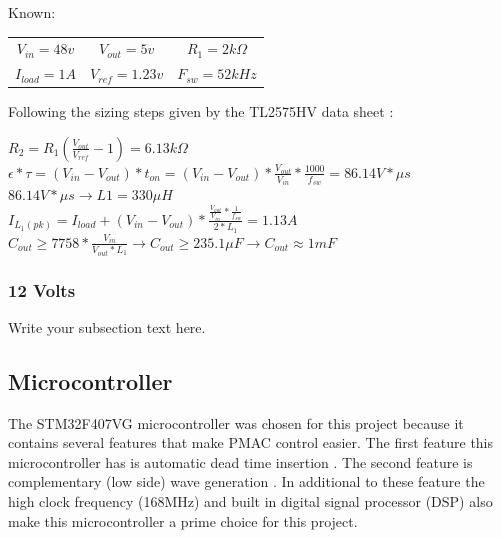 \documentclass{article}
\begin{document}
		\vspace{3mm}
		\noindent Known:
		\begin{center}
			\begin{tabular}{ c c c }
			$V_{in} = 48v$ & $V_{out} = 5v$ & $R_{1} = 2k\Omega$ \\
			$I_{load} = 1A$ & $V_{ref} = 1.23v$ & $F_{sw} = 52kHz$
			\end{tabular}
		\end{center}
	
		\noindent Following the sizing steps given by the TL2575HV data sheet \cite{buck converter}:
		\begin{center}
			$R_{2} = R_{1}(\frac{V_{out}}{V_{ref}} - 1) = 6.13k\Omega$ \\
			\vspace{2mm}
			$\epsilon * \tau = (V_{in} - V_{out})*t_{on} = (V_{in} - V_{out}) * \frac{V_{out}}{V_{in}} * \frac{1000}{f_{sw}} = 86.14 V*\mu s$ \\
			\vspace{4mm}
			$86.14 V*\mu s \rightarrow L1 = 330\mu H$ \\
			\vspace{3mm}
			$I_{L_{1}(pk)} = I_{load} + (V_{in} - V_{out}) * \frac{\frac{V_{out}}{V_{in}} * \frac{1}{f_{sw}}}{2*L_{1}} = 1.13 A$ \\
			\vspace{4mm}
			$C_{out} \ge 7758 * \frac{V_{in}}{V_{out} * L_{1}} \rightarrow C_{out} \ge 235.1\mu F \rightarrow C_{out} \approx 1mF$
		\end{center}
		
		
		\subsubsection{12 Volts}
		Write your subsection text here.
	
		\subsection{Microcontroller}
		The STM32F407VG microcontroller was chosen for this project because it contains several features that make PMAC control easier.  The first feature this microcontroller has is automatic dead time insertion \cite{stm32f4 ref manual}.  The second feature is  complementary (low side) wave generation \cite{stm32f4 ref manual}.  In additional to these feature the high clock frequency (168MHz) and built in digital signal processor (DSP) \cite{stm32f4 ref manual} also make this microcontroller a prime choice for this project.
	
\end{document}
